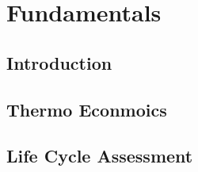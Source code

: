 \chapter{Fundamentals}
\section{Introduction}
\section{Thermo Econmoics}
\section{Life Cycle Assessment}
